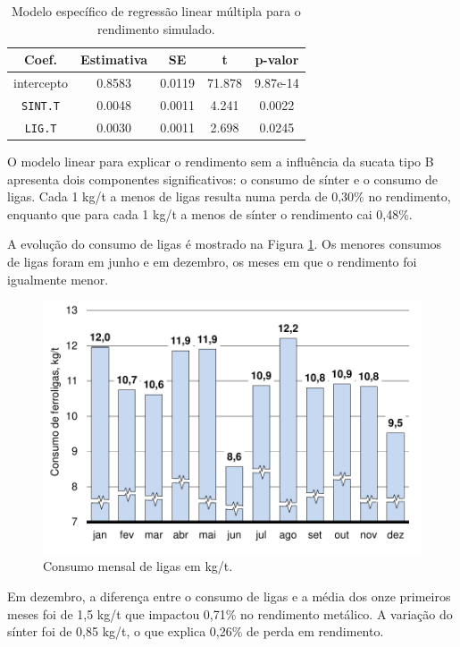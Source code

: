 \begin{multicols}{2}
\begin{table}[H]
\begin{center}
\begin{small}
		\caption{Modelo específico de regressão linear múltipla para o rendimento simulado.}
		\label{tab:newmod}
			\begin{tabular}{ccccc}
				\hline
				Coef. & Estimativa & SE & t & p-valor \\
				\hline \hline
				intercepto		&  0.8583 & 0.0119 &  71.878 & 9.87e-14 \\
				\texttt{SINT.T}	&  0.0048 & 0.0011 &   4.241 & 0.0022  \\
				\texttt{LIG.T}	&  0.0030 & 0.0011 &   2.698 & 0.0245  \\
				\hline
			\end{tabular}
			\end{small}
			\end{center}
	\end{table}						
	O modelo linear para explicar o rendimento sem a influência da sucata tipo B apresenta dois componentes significativos: o consumo de sínter e o consumo de ligas. Cada 1 kg/t a menos de ligas resulta numa perda de 0,30\% no rendimento, enquanto que para cada
	1 kg/t a menos de sínter o rendimento cai 0,48\%.
	
	A evolução do consumo de ligas é mostrado na Figura \ref{fig:ligas_mes}. Os menores consumos de ligas foram em junho e em dezembro, os meses em que o rendimento foi igualmente menor.
	\begin{figure}[H]
		\centering
		\includegraphics[scale=0.55, bb=0 0 432 288, trim=0in 0in 0in 0in]{figures/fig11-excel.pdf} %
		\caption{Consumo mensal de ligas em kg/t\cite{rel16}.}
		\label{fig:ligas_mes}
	\end{figure}			
	Em dezembro, a diferença entre o consumo de ligas e a média dos onze primeiros meses foi de 1,5 kg/t que impactou 0,71\% no rendimento metálico. A variação do sínter foi de 0,85 kg/t, o que explica 0,26\% de perda em rendimento.
	

\end{multicols}
